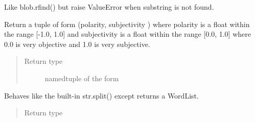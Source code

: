 \documentclass[letterpaper,10pt,english]{sphinxmanual}
\begin{document}
\begin{fulllineitems}
\begin{fulllineitems}
\end{fulllineitems}


\begin{fulllineitems}
\label{api_reference:textblob_de.blob.BaseBlob.rindex}
Like blob.rfind() but raise ValueError when substring is not
found.

\end{fulllineitems}


\begin{fulllineitems}
\label{api_reference:textblob_de.blob.BaseBlob.sentiment}
Return a tuple of form (polarity, subjectivity ) where polarity
is a float within the range {[}-1.0, 1.0{]} and subjectivity is a float
within the range {[}0.0, 1.0{]} where 0.0 is very objective and 1.0 is
very subjective.
\begin{quote}\begin{description}
\item[{Return type}] \leavevmode
namedtuple of the form 

\end{description}\end{quote}

\end{fulllineitems}


\begin{fulllineitems}
\label{api_reference:textblob_de.blob.BaseBlob.split}
Behaves like the built-in str.split() except returns a
WordList.
\begin{quote}\begin{description}
\item[{Return type}] \leavevmode
{\hyperref[api_reference:textblob_de.blob.WordList]{}}

\end{description}\end{quote}

\end{fulllineitems}



\end{fulllineitems}
\end{document}
